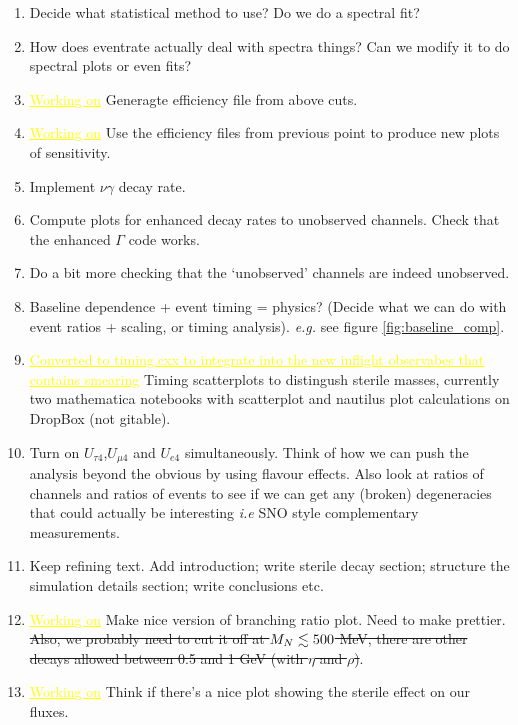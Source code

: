 \documentclass[11pt, a4paper]{article}
\def\ster{\ensuremath N}
\newcommand{\newtext}[2]{\textcolor{#1}{\ul{#2}}}
\begin{document}
\begin{enumerate}

\item Decide what statistical method to use? Do we do a spectral fit?

\item How does eventrate actually deal with spectra things? Can we modify it to 
do spectral plots or even fits?

\item \newtext{MARK}{Working on} Generagte efficiency file from above cuts.

\item \newtext{MARK}{Working on} Use the efficiency files from previous point to produce new plots of
sensitivity.

\item Implement $\nu\gamma$ decay rate. 

\item Compute plots for enhanced decay rates to unobserved channels. Check that
the enhanced $\Gamma$ code works.

\item Do a bit more checking that the `unobserved' channels are indeed unobserved.

\item Baseline dependence + event timing = physics? (Decide what we can do with
event ratios + scaling, or timing analysis).  \emph{e.g.} see figure
\ref{fig:baseline_comp}.

\item \newtext{MARK}{Converted to timing.cxx to integrate into the new inflight observabes that contains smearing} Timing scatterplots to distingush sterile masses, currently two mathematica notebooks with scatterplot and nautilus plot calculations on DropBox (not gitable).

\item Turn on $U_{\tau 4}$,$U_{\mu 4}$ and $U_{e4}$ simultaneously. Think of
how we can push the analysis beyond the obvious by using flavour effects. Also
look at ratios of channels and ratios of events to see if we can get any
(broken) degeneracies that could actually be interesting \emph{i.e} SNO style
complementary measurements.

\item Keep refining text. Add introduction; write sterile decay section; structure 
the simulation details section; write conclusions etc.

\item \newtext{MARK}{Working on} Make nice version of branching ratio plot. Need to make prettier. \sout{Also, we probably need to cut it off at 
	$M_\ster\lesssim 500$ MeV, there are other decays allowed between 0.5 and 1 GeV (with $\eta$ and $\rho$)}.

\item \newtext{MARK}{Working on} Think if there's a nice plot showing the sterile effect on our fluxes.

\end{enumerate}



{}
\end{document}
